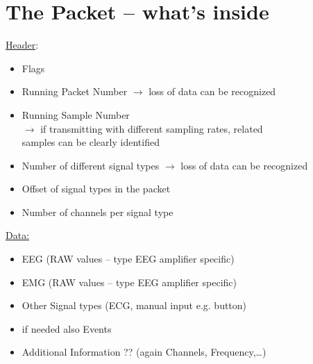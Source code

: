 \documentclass[11pt]{scrartcl}
\begin{document}
\clearpage

\section{The Packet -- what's inside}

  \underline{Header}:
  \begin{itemize}
    \item Flags
    \item Running Packet Number $\rightarrow$ loss of data can be recognized
    \item Running Sample Number\\
      \hspace*{0.15cm}$\rightarrow$ if transmitting with different sampling rates, related\\
      \hspace*{0.5cm} samples can be clearly identified
    \item Number of different signal types $\rightarrow$ loss of data can be recognized
    \item Offset of signal types in the packet
    \item Number of channels per signal type
  \end{itemize}

  \underline{Data:}
  \begin{itemize}
    \item EEG (RAW values -- type EEG amplifier specific)
    \item EMG (RAW values -- type EEG amplifier specific)
    \item Other Signal types (ECG, manual input e.g. button)
    \newline
    \item if needed also Events
    \item Additional Information ?? (again Channels, Frequency,\dots)
  \end{itemize}
  
\end{document}
